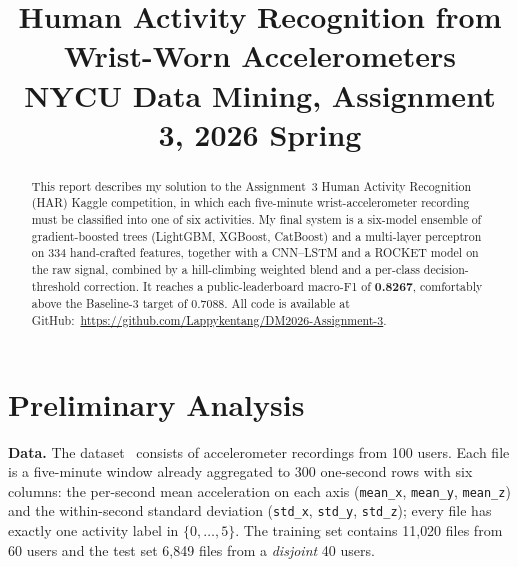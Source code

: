 \documentclass[conference]{IEEEtran}
\begin{document}
\title{Human Activity Recognition from Wrist-Worn Accelerometers\\
{\footnotesize NYCU Data Mining, Assignment 3, 2026 Spring}
}

\author{}

\maketitle

\begin{abstract}
This report describes my solution to the Assignment~3 Human Activity Recognition
(HAR) Kaggle competition, in which each five-minute wrist-accelerometer recording
must be classified into one of six activities. My final system is a six-model
ensemble of gradient-boosted trees (LightGBM, XGBoost, CatBoost) and a multi-layer
perceptron on 334 hand-crafted features, together with a CNN--LSTM and a ROCKET
model on the raw signal, combined by a hill-climbing weighted blend and a per-class
decision-threshold correction. It reaches a public-leaderboard macro-F1 of
\textbf{0.8267}, comfortably above the Baseline-3 target of 0.7088. All code is
available at GitHub:~\href{https://github.com/Lappykentang/DM2026-Assignment-3}{\color{blue}https://github.com/Lappykentang/DM2026-Assignment-3}.
\end{abstract}

\section{Preliminary Analysis}
\textbf{Data.} The dataset~\cite{bruno2014public} consists of accelerometer
recordings from 100 users. Each file is a five-minute window already aggregated to
300 one-second rows with six columns: the per-second mean acceleration on each axis
(\texttt{mean\_x}, \texttt{mean\_y}, \texttt{mean\_z}) and the within-second standard
deviation (\texttt{std\_x}, \texttt{std\_y}, \texttt{std\_z}); every file has exactly
one activity label in $\{0,\dots,5\}$. The training set contains 11{,}020 files from
60 users and the test set 6{,}849 files from a \emph{disjoint} 40 users.
\end{document}
